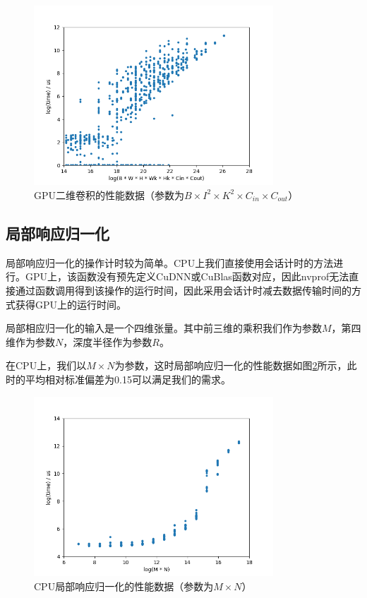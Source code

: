     \begin{figure}[!htbp]
        \centering
        \includegraphics[width=0.8\textwidth]{figures/conv_gpu.png}
        \caption{GPU二维卷积的性能数据（参数为$ B \times I^2 \times K^2 \times C_{in} \times C_{out} $）}
        \label{fig:conv_gpu}
    \end{figure}
    
\subsection{局部响应归一化}
    局部响应归一化的操作计时较为简单。CPU上我们直接使用会话计时的方法进行。GPU上，该函数没有预先定义CuDNN或CuBlas函数对应，因此nvprof无法直接通过函数调用得到该操作的运行时间，因此采用会话计时减去数据传输时间的方式获得GPU上的运行时间。

    局部相应归一化的输入是一个四维张量。其中前三维的乘积我们作为参数$ M $，第四维作为参数$ N $，深度半径作为参数$ R $。

    在CPU上，我们以$ M \times N $为参数，这时局部响应归一化的性能数据如图\ref{fig:lrn_cpu}所示，此时的平均相对标准偏差为0.15可以满足我们的需求。
    
    \begin{figure}[!htbp]
        \centering
        \includegraphics[width=0.8\textwidth]{figures/lrn_cpu.png}
        \caption{CPU局部响应归一化的性能数据（参数为$ M \times N $）}
        \label{fig:lrn_cpu}
    \end{figure}


